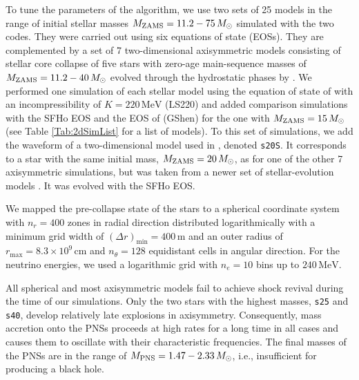 To tune the parameters of the algorithm, we use two sets of 25 models
in the range of initial stellar masses
$M_{\mathrm{ZAMS}} = 11.2 - 75 \, M_{\odot}$ simulated with the two codes.
They were carried out using six equations of state (EOSs).  They are
complemented by a set of 7 two-dimensional axisymmetric models
consisting of stellar core collapse of five stars with zero-age
main-sequence masses of $M_{\mathrm{ZAMS}} = 11.2 - 40 \, M_{\odot}$
evolved through the hydrostatic phases by
\cite{Woosley_Heger_Weaver__2002__ReviewsofModernPhysics__The_evolution_and_explosion_of_massive_stars}.
We performed one simulation of each stellar model using the equation
of state of \cite{Lattimer_Swesty__1991__NuclearPhysicsA__LS-EOS} with
an incompressibility of $K = 220 \, \mathrm{MeV}$ (LS220) and added
comparison simulations with the SFHo EOS
\cite{Steiner_et_al__2013__apj__Core-collapseSupernovaEquationsofStateBasedonNeutronStarObservations}
and the EOS of
\cite{Shen_et_al__2011__prc__Newequationofstateforastrophysicalsimulations}
(GShen) for the one with $M_{\mathrm{ZAMS}} = 15 \, M_{\odot}$ (see Table
\ref{Tab:2dSimList} for a list of models).  To this set of
simulations, we add the waveform of a two-dimensional model used in
\cite{Torres:2019a}, denoted \texttt{s20S}.  It corresponds to a star
with the same initial mass, $M_{\mathrm{ZAMS}} = 20 \, M_{\odot}$, as for
one of the other 7 axisymmetric simulations, but was taken from a
newer set of stellar-evolution models
\cite{Woosley_Heger__2007__physrep__Nucleosynthesisandremnantsinmassivestarsofsolarmetallicity}.
It was evolved with the SFHo EOS.

We mapped the pre-collapse state of the stars to a spherical
coordinate system with $n_r = 400$ zones in radial direction
distributed logarithmically with a minimum grid width of
$(\Delta r)_{\mathrm{min}} = 400 \, \mathrm{m}$ and an outer radius of
$r_{\mathrm{max}} = 8.3 \times 10^{9} \, \mathrm{cm}$ and
$n_{\theta} = 128$ equidistant cells in angular direction.  For the
neutrino energies, we used a logarithmic grid with $n_e = 10$ bins up
to $240 \, \mathrm{MeV}$.

All spherical and most axisymmetric models fail to achieve shock
revival during the time of our simulations.  Only the two stars with
the highest masses, \texttt{s25} and \texttt{s40}, develop relatively
late explosions in axisymmetry.  Consequently, mass accretion onto the
PNSs proceeds at high rates for a long time in all cases and causes
them to oscillate with their characteristic frequencies.  The final
masses of the PNSs are in the range of
$M_{\mathrm{PNS}} = 1.47 - 2.33 \, M_{\odot}$, i.e., insufficient for
producing a black hole.

